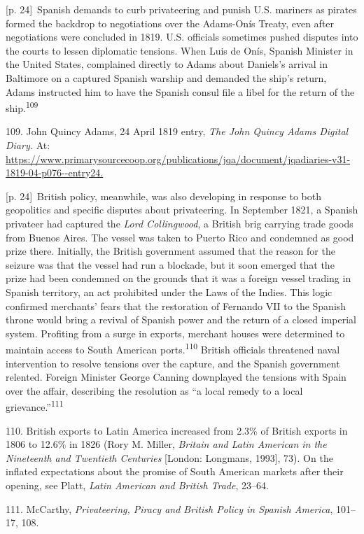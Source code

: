 \documentclass[10pt,a4paper]{article}
\begin{document}
{\scriptsize\color{gray} [p. 24]}\ Spanish demands to curb privateering and punish U.S. mariners as pirates formed the backdrop to negotiations over the Adams-Onís Treaty, even after negotiations were concluded in 1819. U.S. officials sometimes pushed disputes into the courts to lessen diplomatic tensions. When Luis de Onís, Spanish Minister in the United States, complained directly to Adams about Daniels’s arrival in Baltimore on a captured Spanish warship and demanded the ship’s return, Adams instructed him to have the Spanish consul file a libel for the return of the ship.\nobreak\textsuperscript{109}\par{\small 109. John Quincy Adams, 24 April 1819 entry, \textit{The John Quincy Adams Digital Diary.} At: \url{https://www.primarysourcecoop.org/publications/jqa/document/jqadiaries-v31-1819-04-p076--entry24.}\par}
{\scriptsize\color{gray} [p. 24]}\ British policy, meanwhile, was also developing in response to both geopolitics and specific disputes about privateering. In September 1821, a Spanish privateer had captured the \textit{Lord Collingwood}, a British brig carrying trade goods from Buenos Aires. The vessel was taken to Puerto Rico and condemned as good prize there. Initially, the British government assumed that the reason for the seizure was that the vessel had run a blockade, but it soon emerged that the prize had been condemned on the grounds that it was a foreign vessel trading in Spanish territory, an act prohibited under the Laws of the Indies. This logic confirmed merchants’ fears that the restoration of Fernando VII to the Spanish throne would bring a revival of Spanish power and the return of a closed imperial system. Profiting from a surge in exports, merchant houses were determined to maintain access to South American ports.\nobreak\textsuperscript{110} British officials threatened naval intervention to resolve tensions over the capture, and the Spanish government relented. Foreign Minister George Canning downplayed the tensions with Spain over the affair, describing the resolution as “a local remedy to a local grievance.”\nobreak\textsuperscript{111}\par{\small 110. British exports to Latin America increased from 2.3\% of British exports in 1806 to 12.6\% in 1826 (Rory M. Miller, \textit{Britain and Latin American in the Nineteenth and Twentieth Centuries} [London: Longmans, 1993], 73). On the inflated expectations about the promise of South American markets after their opening, see Platt, \textit{Latin American and British Trade}, 23–64.\par}{\small 111. McCarthy, \textit{Privateering, Piracy and British Policy in Spanish America}, 101–17, 108.\par}
\end{document}
